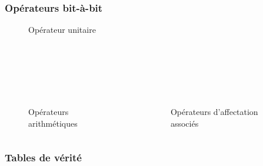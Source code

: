 \documentclass{cppcourses}
\begin{document}
\begin{frame}

\frametitle{Opérateurs bit-à-bit}

\begin{figure}
\caption{Opérateur unitaire}
\end{figure}

\begin{columns}
    \begin{column}{0.5\textwidth}
        \begin{figure}
 \\
 \\
 \\
 \\
\caption{Opérateurs arithmétiques}
            \end{figure}
        \end{column}
        \begin{column}{0.5\textwidth}
            \begin{figure}
 \\
 \\
 \\
 \\
\caption{Opérateurs d'affectation associés}
        \end{figure}
    \end{column}
\end{columns}

\end{frame}

\subsubsection{Tables de vérité}
\end{document}
